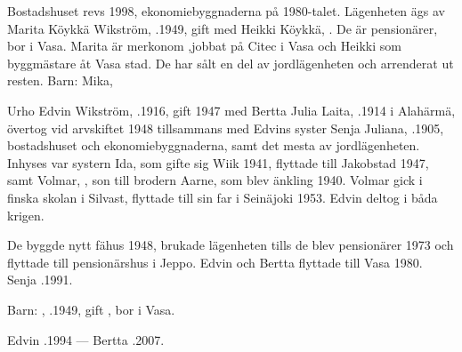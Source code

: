 %
Bostadshuset revs 1998,  ekonomiebyggnaderna på 1980-talet. Lägenheten ägs av Marita Köykkä Wikström, .1949, gift med Heikki Köykkä, . De är pensionärer, bor i Vasa. Marita är merkonom ,jobbat på Citec i Vasa och Heikki som byggmästare åt Vasa stad. De har sålt en del av jordlägenheten och arrenderat ut resten.
Barn: Mika, 


%
Urho Edvin Wikström, .1916, gift 1947 med Bertta Julia Laita, .1914 i Alahärmä, övertog vid arvskiftet 1948 tillsammans med Edvins syster Senja Juliana, .1905, bostadshuset och ekonomiebyggnaderna, samt det mesta av jordlägenheten. Inhyses var systern Ida, som gifte sig Wiik 1941, flyttade till Jakobstad 1947, samt Volmar, , son till brodern Aarne, som blev änkling 1940. Volmar gick i finska skolan i Silvast, flyttade till sin far i Seinäjoki 1953. Edvin deltog i båda krigen.

De byggde nytt fähus 1948, brukade lägenheten tills de blev pensionärer 1973 och flyttade till pensionärshus i Jeppo. Edvin och Bertta flyttade till Vasa 1980. Senja .1991.

Barn: , .1949, gift , bor i Vasa.

Edvin .1994  ---  Bertta .2007.



